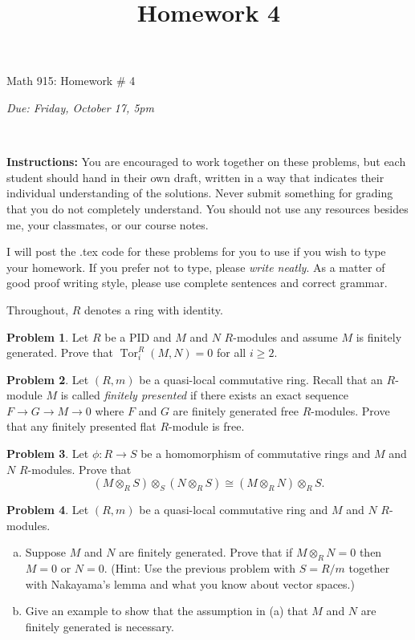\documentclass[11pt]{article}
\title{}
\date{\vspace{-0.5in}}
\title{Homework 4}
\theoremstyle{definition}
\newtheorem{problem}{Problem}
\newcommand{\Tor}{\operatorname{Tor}}
\begin{document}
\vspace{3em}

\begin{center}
	{\LARGE Math 915: Homework \# 4}
\end{center}
\begin{center}
{\it Due:  Friday, October 17, 5pm}
\end{center}

\

\noindent
{\bf Instructions:}
You are encouraged to work together on these problems, but each student should hand in their own draft, written in a way that indicates their individual understanding of the solutions. Never submit something for grading that you do not completely understand. You should not use any resources besides me, your classmates, or our course notes.

\medskip
\noindent
I will post the .tex code for these problems for you to use if you wish to type your homework. If you prefer not to type, please  {\em write neatly}. As a matter of good proof writing style, please use complete sentences and correct grammar. 


\medskip
\noindent
Throughout, $R$ denotes a ring with identity.

\medskip


\begin{problem} Let $R$ be a PID and $M$ and $N$ $R$-modules and assume $M$ is finitely generated.  Prove that $\Tor_i^R(M,N)=0$ for all $i\ge 2$.
\end{problem}

\begin{problem} Let $(R,m)$ be a quasi-local commutative ring. Recall that an $R$-module $M$ is called {\it finitely presented} if there exists an exact sequence $F\to G\to M\to 0$ where $F$ and $G$ are finitely generated free $R$-modules.   Prove that any finitely presented flat $R$-module is free.
\end{problem}

\begin{problem} Let $\phi:R\to S$ be a homomorphism of commutative rings and $M$ and $N$ $R$-modules.
Prove that 
$$(M\otimes_R S)\otimes_{S} (N\otimes_R S)\cong (M\otimes_R N)\otimes_R S.$$
\end{problem}

\begin{problem} Let $(R,m)$ be a quasi-local commutative ring and $M$ and $N$ $R$-modules. 
\begin{enumerate}[(a)]
\item Suppose $M$ and $N$ are finitely generated.  Prove that if $M\otimes_R N=0$ then $M=0$ or $N=0$. (Hint:  Use the previous problem with $S=R/m$ together with Nakayama's lemma and what you know about vector spaces.)
\item Give an example to show that the assumption in (a) that $M$ and $N$ are finitely generated is necessary.
\end{enumerate}
\end{problem}
\end{document}
